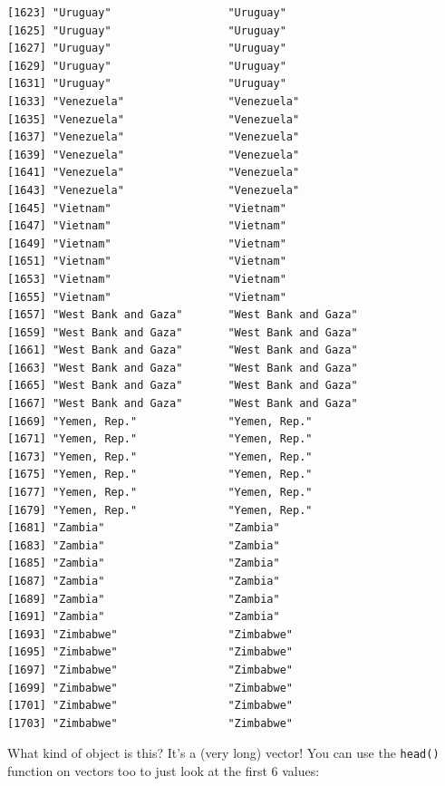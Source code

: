 \documentclass[
  letterpaper,
  DIV=11,
  numbers=noendperiod]{scrreprt}
\begin{document}
\begin{verbatim}
[1623] "Uruguay"                  "Uruguay"                 
[1625] "Uruguay"                  "Uruguay"                 
[1627] "Uruguay"                  "Uruguay"                 
[1629] "Uruguay"                  "Uruguay"                 
[1631] "Uruguay"                  "Uruguay"                 
[1633] "Venezuela"                "Venezuela"               
[1635] "Venezuela"                "Venezuela"               
[1637] "Venezuela"                "Venezuela"               
[1639] "Venezuela"                "Venezuela"               
[1641] "Venezuela"                "Venezuela"               
[1643] "Venezuela"                "Venezuela"               
[1645] "Vietnam"                  "Vietnam"                 
[1647] "Vietnam"                  "Vietnam"                 
[1649] "Vietnam"                  "Vietnam"                 
[1651] "Vietnam"                  "Vietnam"                 
[1653] "Vietnam"                  "Vietnam"                 
[1655] "Vietnam"                  "Vietnam"                 
[1657] "West Bank and Gaza"       "West Bank and Gaza"      
[1659] "West Bank and Gaza"       "West Bank and Gaza"      
[1661] "West Bank and Gaza"       "West Bank and Gaza"      
[1663] "West Bank and Gaza"       "West Bank and Gaza"      
[1665] "West Bank and Gaza"       "West Bank and Gaza"      
[1667] "West Bank and Gaza"       "West Bank and Gaza"      
[1669] "Yemen, Rep."              "Yemen, Rep."             
[1671] "Yemen, Rep."              "Yemen, Rep."             
[1673] "Yemen, Rep."              "Yemen, Rep."             
[1675] "Yemen, Rep."              "Yemen, Rep."             
[1677] "Yemen, Rep."              "Yemen, Rep."             
[1679] "Yemen, Rep."              "Yemen, Rep."             
[1681] "Zambia"                   "Zambia"                  
[1683] "Zambia"                   "Zambia"                  
[1685] "Zambia"                   "Zambia"                  
[1687] "Zambia"                   "Zambia"                  
[1689] "Zambia"                   "Zambia"                  
[1691] "Zambia"                   "Zambia"                  
[1693] "Zimbabwe"                 "Zimbabwe"                
[1695] "Zimbabwe"                 "Zimbabwe"                
[1697] "Zimbabwe"                 "Zimbabwe"                
[1699] "Zimbabwe"                 "Zimbabwe"                
[1701] "Zimbabwe"                 "Zimbabwe"                
[1703] "Zimbabwe"                 "Zimbabwe"                
\end{verbatim}

What kind of object is this? It's a (very long) vector! You can use the
\texttt{head()} function on vectors too to just look at the first 6
values:
\end{document}
